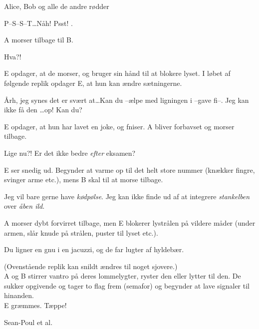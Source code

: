 \begin{Sketch}{Alice, Bob og alle de andre rødder}
\begin{Replik}[S]
  P--S--S--T\dots Nåh! Psst! .
\end{Replik}

\begin{Regi}
  A morser tilbage til B.
\end{Regi}

\begin{Replik}[S]
  Hva?!
\end{Replik}

\begin{Regi}
  E opdager, at de morser, og bruger sin hånd til at blokere
  lyset. I løbet af følgende replik opdager E, at hun kan ændre sætningerne.
\end{Regi}

\begin{Replik}[S]
  Årh, jeg synes det er svært at\dots Kan du --ælpe med ligningen i --gave
  fi--. Jeg kan ikke få den \dots op! Kan du?
\end{Replik}

\begin{Regi}
  E opdager, at hun har lavet en joke, og fniser. A bliver forbavset
  og morser tilbage.
\end{Regi}

\begin{Replik}[S]
  Lige nu?! Er det ikke bedre \emph{efter} eksamen?
\end{Replik}

\begin{Regi}
  E ser snedig ud. Begynder at varme op til det helt store nummer
  (knækker fingre, svinger arme etc.), mens B skal til at morse tilbage.
\end{Regi}

\begin{Replik}[S]
  Jeg vil bare gerne have \emph{kødpølse}. Jeg kan ikke finde ud af at
  integrere \emph{stankelben} over \emph{åben ild}.
\end{Replik}

\begin{Regi}
  A morser dybt forvirret tilbage, men E blokerer lystrålen på vildere
  måder (under armen, slår knude på strålen, puster til lyset etc.).
\end{Regi}

\begin{Replik}[S]
  Du ligner en gnu i en jacuzzi, og de far lugter af hyldebær.
\end{Replik}

\begin{Regi}
  (Ovenstående replik kan snildt ændres til noget sjovere.)\\
  A og B stirrer vantro på deres lommelygter, ryster den eller lytter
  til den. De sukker opgivende og tager to flag frem (semafor) og
  begynder at lave signaler til hinanden.\\
  E græmmes. Tæppe!
\end{Regi}

\end{Sketch}

\begin{Footer}
Sean-Poul et al.
\end{Footer}
